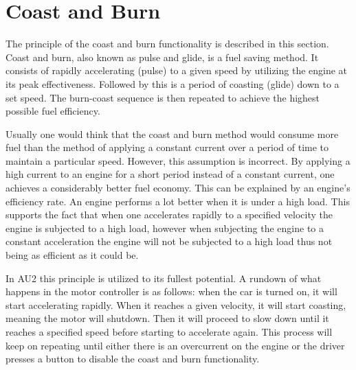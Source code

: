 \section{Coast and Burn}
The principle of the coast and burn functionality is described in this section.
Coast and burn, also known as pulse and glide, is a fuel saving method. It consists of rapidly accelerating (pulse) to a given speed by utilizing the engine at its peak effectiveness. Followed by this is a period of coasting (glide) down to a set speed. The burn-coast sequence is then repeated to achieve the highest possible fuel efficiency.

Usually one would think that the coast and burn method would consume more fuel than the method of applying a constant current over a period of time to maintain a particular speed. However, this assumption is incorrect. By applying a high current to an engine for a short period instead of a constant current, one achieves a considerably better fuel economy. This can be explained by an engine’s efficiency rate. An engine performs a lot better when it is under a high load. This supports the fact that when one accelerates rapidly to a specified velocity the engine is subjected to a high load, however when subjecting the engine to a constant acceleration the engine will not be subjected to a high load thus not being as efficient as it could be.

In AU2 this principle is utilized to its fullest potential. A rundown of what happens in the motor controller is as follows: when the car is turned on, it will start accelerating rapidly. When it reaches a given velocity, it will start coasting, meaning the motor will shutdown. Then it will proceed to slow down until it reaches a specified speed before starting to accelerate again. This process will keep on repeating until either there is an overcurrent on the engine or the driver presses a button to disable the coast and burn functionality.


